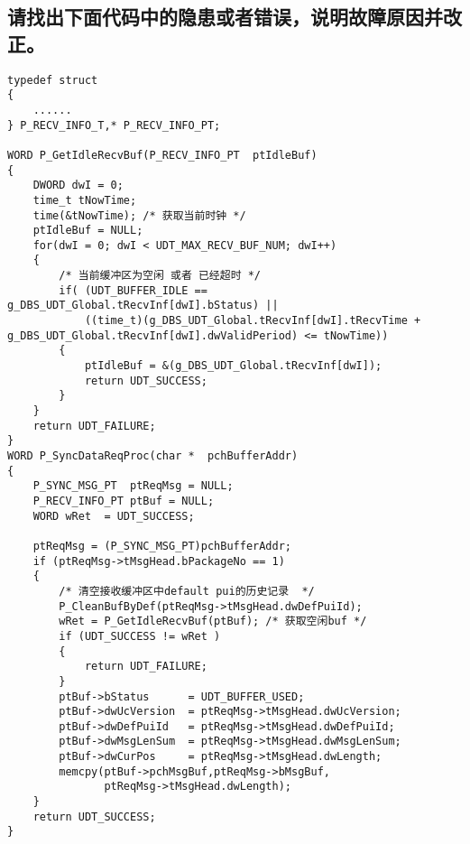 ﻿\documentclass  [11pt,twocolumn,landscape]{article}
\begin{document}
\subsection{请找出下面代码中的隐患或者错误，说明故障原因并改正。}
\begin{lstlisting}
typedef struct
{
    ......
} P_RECV_INFO_T,* P_RECV_INFO_PT;

WORD P_GetIdleRecvBuf(P_RECV_INFO_PT  ptIdleBuf)
{
    DWORD dwI = 0;
    time_t tNowTime;
    time(&tNowTime); /* 获取当前时钟 */
    ptIdleBuf = NULL;
    for(dwI = 0; dwI < UDT_MAX_RECV_BUF_NUM; dwI++)
    {
        /* 当前缓冲区为空闲 或者 已经超时 */
        if( (UDT_BUFFER_IDLE == g_DBS_UDT_Global.tRecvInf[dwI].bStatus) ||
            ((time_t)(g_DBS_UDT_Global.tRecvInf[dwI].tRecvTime + g_DBS_UDT_Global.tRecvInf[dwI].dwValidPeriod) <= tNowTime))
        {
            ptIdleBuf = &(g_DBS_UDT_Global.tRecvInf[dwI]);
            return UDT_SUCCESS;
        }
    }
    return UDT_FAILURE;    
}
WORD P_SyncDataReqProc(char *  pchBufferAddr)
{
    P_SYNC_MSG_PT  ptReqMsg = NULL;
    P_RECV_INFO_PT ptBuf = NULL; 
    WORD wRet  = UDT_SUCCESS;
        
    ptReqMsg = (P_SYNC_MSG_PT)pchBufferAddr;
    if (ptReqMsg->tMsgHead.bPackageNo == 1)
    {
        /* 清空接收缓冲区中default pui的历史记录  */
        P_CleanBufByDef(ptReqMsg->tMsgHead.dwDefPuiId); 
        wRet = P_GetIdleRecvBuf(ptBuf); /* 获取空闲buf */
        if (UDT_SUCCESS != wRet )
        {
            return UDT_FAILURE;
        }
        ptBuf->bStatus      = UDT_BUFFER_USED;
        ptBuf->dwUcVersion	= ptReqMsg->tMsgHead.dwUcVersion;
        ptBuf->dwDefPuiId   = ptReqMsg->tMsgHead.dwDefPuiId;
        ptBuf->dwMsgLenSum  = ptReqMsg->tMsgHead.dwMsgLenSum;
        ptBuf->dwCurPos     = ptReqMsg->tMsgHead.dwLength;
        memcpy(ptBuf->pchMsgBuf,ptReqMsg->bMsgBuf,
               ptReqMsg->tMsgHead.dwLength);  
    }
    return UDT_SUCCESS;
}
\end{lstlisting}
\end{document}
